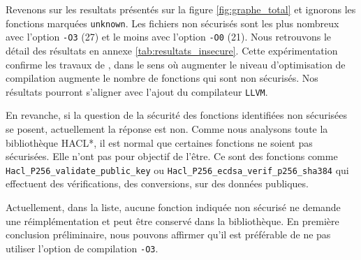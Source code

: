 Revenons sur les resultats présentés sur la figure \ref{fig:graphe_total} et ignorons les fonctions marquées \texttt{unknown}. Les fichiers non sécurisés sont les plus nombreux avec l'option \texttt{-O3} (27) et le moins avec l'option \texttt{-O0} (21). Nous retrouvons le détail des résultats en annexe \ref{tab:resultats_insecure}. Cette expérimentation confirme les travaux de \citeauthor{schneider2024breakingbadcompilersbreak}, dans le sens où augmenter le niveau d'optimisation de compilation augmente le nombre de fonctions qui sont non sécurisés. Nos résultats pourront s'aligner avec l'ajout du compilateur \texttt{LLVM}.\smallbreak 

En revanche, si la question de la sécurité des fonctions identifiées non sécurisées se posent, actuellement la réponse est non. Comme nous analysons toute la bibliothèque HACL*, il est normal que certaines fonctions ne soient pas sécurisées. Elle n'ont pas pour objectif de l'être. Ce sont des fonctions comme \texttt{Hacl\_P256\_\-vali\-date\_public\_key} ou \texttt{Hacl\_P256\_\-ecdsa\_\-verif\_p256\_sha384} qui effectuent des vérifications, des conversions, sur des données publiques. 

Actuellement, dans la liste, aucune fonction indiquée non sécurisé ne demande une réimplémentation et peut être conservé dans la bibliothèque. En première conclusion préliminaire, nous pouvons affirmer qu'il est préférable de ne pas utiliser l'option de compilation \texttt{-O3}.


